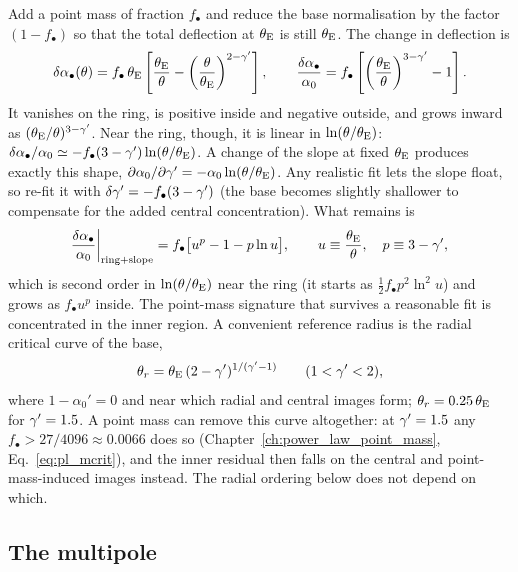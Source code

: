 Add a point mass of fraction $f_\bullet$ and reduce the base
normalisation by the factor $(1-f_\bullet)$ so that the total
deflection at $\theta_{\mathrm{E}}$ is still $\theta_{\mathrm{E}}$.  The change in deflection
is
\begin{equation}
    \delta\alpha_\bullet(\theta)
    = f_\bullet\,\theta_{\mathrm{E}}\left[\frac{\theta_{\mathrm{E}}}{\theta}
      - \left(\frac{\theta}{\theta_{\mathrm{E}}}\right)^{2-\gamma'}\right],
    \qquad
    \frac{\delta\alpha_\bullet}{\alpha_0}
    = f_\bullet\left[\left(\frac{\theta_{\mathrm{E}}}{\theta}\right)^{3-\gamma'} - 1\right].
    \label{eq:mu_res_pm}
\end{equation}
It vanishes on the ring, is positive inside and negative outside, and
grows inward as $(\theta_{\mathrm{E}}/\theta)^{3-\gamma'}$.  Near the ring, though, it
is linear in $\ln(\theta/\theta_{\mathrm{E}})$:
$\delta\alpha_\bullet/\alpha_0 \simeq -f_\bullet(3-\gamma')\ln(\theta/\theta_{\mathrm{E}})$.
A change of the slope at fixed $\theta_{\mathrm{E}}$ produces exactly this shape,
$\partial\alpha_0/\partial\gamma' = -\alpha_0\ln(\theta/\theta_{\mathrm{E}})$.  Any
realistic fit lets the slope float, so re-fit it with
$\delta\gamma' = -f_\bullet(3-\gamma')$ (the base becomes slightly shallower to
compensate for the added central concentration).  What remains is
\begin{equation}
    \frac{\delta\alpha_\bullet}{\alpha_0}\bigg|_{\rm ring+slope}
    = f_\bullet\big[u^{p} - 1 - p\ln u\big],
    \qquad u\equiv\frac{\theta_{\mathrm{E}}}{\theta},\quad p\equiv 3-\gamma',
    \label{eq:mu_res_refit}
\end{equation}
which is second order in $\ln(\theta/\theta_{\mathrm{E}})$ near the ring
(it starts as $\tfrac12 f_\bullet p^2\ln^2 u$) and grows as
$f_\bullet u^p$ inside.  The point-mass signature that survives a
reasonable fit is concentrated in the inner region.  A convenient
reference radius is the radial critical curve of the base,
\begin{equation}
    \theta_r = \theta_{\mathrm{E}}\,(2-\gamma')^{1/(\gamma'-1)}
    \qquad(1<\gamma'<2),
    \label{eq:mu_theta_r}
\end{equation}
where $1-\alpha_0'=0$ and near which radial and central images form;
$\theta_r = 0.25\,\theta_{\mathrm{E}}$ for $\gamma'=1.5$.  A point mass can remove
this curve altogether: at $\gamma'=1.5$ any $f_\bullet > 27/4096 \approx
0.0066$ does so (Chapter~\ref{ch:power_law_point_mass},
Eq.~\eqref{eq:pl_mcrit}), and the inner residual then falls on the
central and point-mass-induced images instead.  The radial ordering
below does not depend on which.

\subsection{The multipole}

